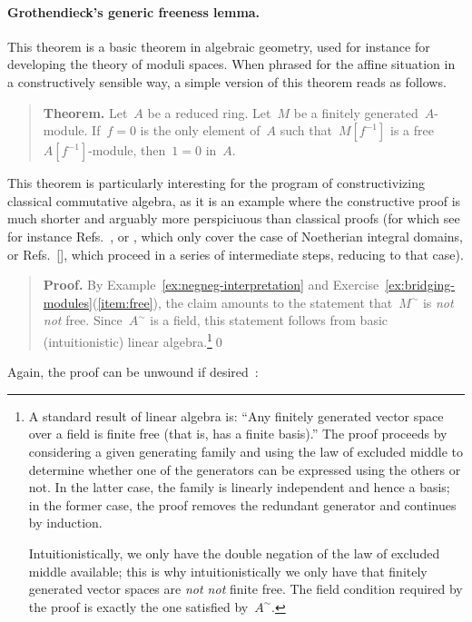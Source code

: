 \documentclass{ws-rv9x6}
\renewcommand{\_}{\mathpunct{.}}
\newcommand{\?}{\,{:}\,}
\newcommand{\notnot}{\emph{not not}\xspace}
\begin{document}
\paragraph{Grothendieck's generic freeness lemma.} This theorem is a basic
theorem in algebraic geometry, used for instance for developing the theory of
moduli spaces. When phrased for the affine situation in a constructively
sensible way, a simple version of this theorem reads as follows.\par
\begin{quote}
\textbf{Theorem.}
Let~$A$ be a reduced ring. Let~$M$ be a finitely generated~$A$-module.
If~$f = 0$ is the only element of~$A$ such that~$M[f^{-1}]$ is a
free~$A[f^{-1}]$-module, then~$1 = 0$ in~$A$.
\end{quote}
This theorem is particularly interesting for the program of constructivizing
classical commutative algebra, as it is an example where the constructive proof
is much shorter and arguably more perspiciuous than classical proofs (for which
see for instance Refs.~\cite[Lemme~6.9.2]{ega-4-2},
\cite[Thm.~24.1]{matsumura:commutative-ring-theory} or
\cite[Thm.~14.4]{eisenbud:commutative-algebra}, which only cover the case of
Noetherian integral domains, or Refs.~[],
\cite[{\href{https://stacks.math.columbia.edu/tag/051Q}{Tag~051Q}}]{stacks-project}
which proceed in a series of intermediate steps, reducing to that case).\par
\begin{quote}
\textbf{Proof.} By Example~\ref{ex:negneg-interpretation} and
Exercise~\ref{ex:bridging-modules}(\ref{item:free}), the claim amounts to the statement that~$M^\sim$ is \notnot
free. Since~$A^\sim$ is a field, this statement follows from
basic (intuitionistic) linear algebra.\footnote{A standard result of linear
algebra is: ``Any finitely generated vector space over a field is finite free
(that is, has a finite basis).'' The proof proceeds by considering a given
generating family and using the law of excluded middle to determine whether one
of the generators can be expressed using the others or not. In the latter case,
the family is linearly independent and hence a basis; in the former case, the
proof removes the redundant generator and continues by induction.

Intuitionistically, we only have the double negation of the law of excluded
middle available; this is why intuitionistically we only have that finitely
generated vector spaces are \notnot finite free. The field condition required
by the proof is exactly the one satisfied by~$A^\sim$.}\qed\end{quote}
Again, the proof can be unwound if
desired~\cite[Proposition~3]{blechschmidt:generic-freeness}:
\end{document}
